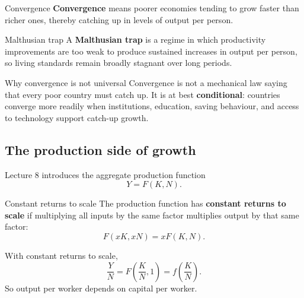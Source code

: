 \documentclass[12pt]{article}
\begin{document}
\begin{definition}{Convergence}{}
\textbf{Convergence} means poorer economies tending to grow faster than richer ones, thereby catching up in levels of output per person.
\end{definition}

\begin{definition}{Malthusian trap}{}
A \textbf{Malthusian trap} is a regime in which productivity improvements are too weak to produce sustained increases in output per person, so living standards remain broadly stagnant over long periods.
\end{definition}

\begin{theorem}{Why convergence is not universal}{}
Convergence is not a mechanical law saying that every poor country must catch up. It is at best \textbf{conditional}: countries converge more readily when institutions, education, saving behaviour, and access to technology support catch-up growth.
\end{theorem}

\newpage
\subsection{The production side of growth}

Lecture 8 introduces the aggregate production function
\[
Y=F(K,N).
\]

\begin{definition}{Constant returns to scale}{}
The production function has \textbf{constant returns to scale} if multiplying all inputs by the same factor multiplies output by that same factor:
\[
F(xK,xN)=xF(K,N).
\]
\end{definition}

With constant returns to scale,
\[
\frac{Y}{N}=F\!\left(\frac{K}{N},1\right)=f\!\left(\frac{K}{N}\right).
\]
So output per worker depends on capital per worker.

\begin{center}
\end{center}
\end{document}
